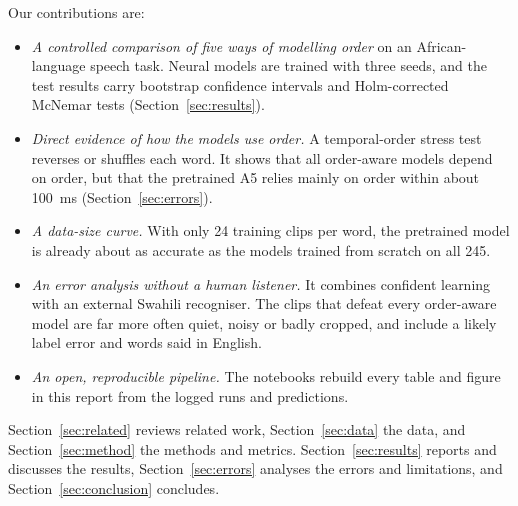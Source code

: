 Our contributions are:
\begin{itemize}
  \item \emph{A controlled comparison of five ways of modelling order} on an African-language speech task. Neural
        models are trained with three seeds, and the test results carry bootstrap confidence intervals and
        Holm-corrected McNemar tests (Section~\ref{sec:results}).
  \item \emph{Direct evidence of how the models use order.} A temporal-order stress test reverses or shuffles each
        word. It shows that all order-aware models depend on order, but that the pretrained A5 relies mainly on
        order within about 100~ms (Section~\ref{sec:errors}).
  \item \emph{A data-size curve.} With only 24 training clips per word, the pretrained model is already about as
        accurate as the models trained from scratch on all 245.
  \item \emph{An error analysis without a human listener.} It combines confident learning with an external Swahili
        recogniser. The clips that defeat every order-aware model are far more often quiet, noisy or badly cropped,
        and include a likely label error and words said in English.
  \item \emph{An open, reproducible pipeline.} The notebooks rebuild every table and figure in this report from the
        logged runs and predictions.
\end{itemize}

Section~\ref{sec:related} reviews related work, Section~\ref{sec:data} the data, and Section~\ref{sec:method} the
methods and metrics. Section~\ref{sec:results} reports and discusses the results, Section~\ref{sec:errors} analyses
the errors and limitations, and Section~\ref{sec:conclusion} concludes.
